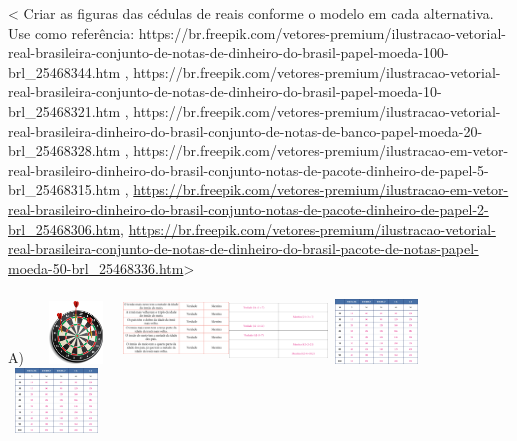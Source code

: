 \textless{} Criar as figuras das cédulas de reais conforme o modelo em
cada alternativa. Use como referência:
https://br.freepik.com/vetores-premium/ilustracao-vetorial-real-brasileira-conjunto-de-notas-de-dinheiro-do-brasil-papel-moeda-100-brl\_25468344.htm
,
https://br.freepik.com/vetores-premium/ilustracao-vetorial-real-brasileira-conjunto-de-notas-de-dinheiro-do-brasil-papel-moeda-10-brl\_25468321.htm
,
https://br.freepik.com/vetores-premium/ilustracao-vetorial-real-brasileira-dinheiro-do-brasil-conjunto-de-notas-de-banco-papel-moeda-20-brl\_25468328.htm
,
https://br.freepik.com/vetores-premium/ilustracao-em-vetor-real-brasileiro-dinheiro-do-brasil-conjunto-notas-de-pacote-dinheiro-de-papel-5-brl\_25468315.htm
,
\url{https://br.freepik.com/vetores-premium/ilustracao-em-vetor-real-brasileiro-dinheiro-do-brasil-conjunto-notas-de-pacote-dinheiro-de-papel-2-brl_25468306.htm},
\url{https://br.freepik.com/vetores-premium/ilustracao-vetorial-real-brasileira-conjunto-de-notas-de-dinheiro-do-brasil-pacote-de-notas-papel-moeda-50-brl_25468336.htm}\textgreater{}

A)
\includegraphics[width=0.98131in,height=0.65625in]{media/image108.png}\includegraphics[width=1.10972in,height=0.74212in]{media/image109.png}\includegraphics[width=1.02736in,height=0.68704in]{media/image110.png}\includegraphics[width=1.01042in,height=0.67572in]{media/image111.png}\includegraphics[width=1.01042in,height=0.67572in]{media/image111.png}

